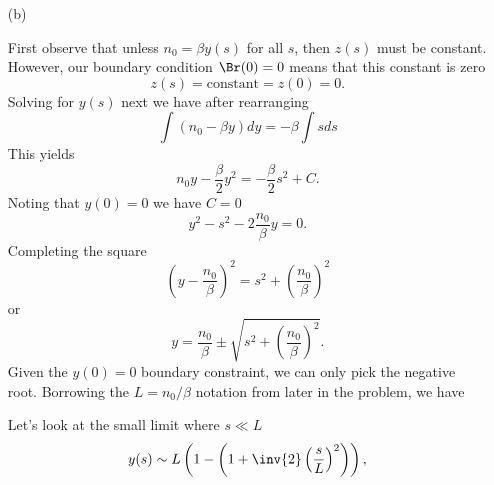 {\begin{enumerate}
We have two non-trivial differential equations to solve.

\item[(b)]

First observe that unless \(n_0 = \beta y(s)\) for all \(s\), then \(z(s)\) must be constant.  However, our boundary condition \(\Br(0) = 0\) means that this constant is zero
%
\begin{equation}\label{eqn:modernOpticsProblemSet1P2:110}
z(s) = \text{constant} = z(0) = 0.
\end{equation}
%
Solving for \(y(s)\) next we have after rearranging
%
\begin{dmath}\label{eqn:modernOpticsProblemSet1P2:130}
\int \left( n_0 - \beta y \right) dy = -\beta \int s ds
\end{dmath}
%
This yields
%
\begin{dmath}\label{eqn:modernOpticsProblemSet1P2:150}
n_0 y - \frac{\beta}{2} y^2 = -\frac{\beta}{2} s^2 + C.
\end{dmath}
%
Noting that \(y(0) = 0\) we have \(C = 0\)
%
\begin{dmath}\label{eqn:modernOpticsProblemSet1P2:170}
y^2 - s^2 - 2 \frac{n_0}{\beta} y = 0.
\end{dmath}
%
Completing the square
%
\begin{dmath}\label{eqn:modernOpticsProblemSet1P2:230}
\left( y - \frac{n_0}{\beta} \right)^2 = s^2 + \left( \frac{n_0}{\beta} \right)^2
\end{dmath}
%
or
%
\begin{dmath}\label{eqn:modernOpticsProblemSet1P2:190}
y = \frac{n_0}{\beta} \pm \sqrt{ s^2 + \left( \frac{n_0}{\beta} \right)^2 }.
\end{dmath}
%
Given the \(y(0) = 0\) boundary constraint, we can only pick the negative root.  Borrowing the \(L = n_0/\beta\) notation from later in the problem, we have


Let's look at the small limit where \(s \ll L\)
%
\begin{dmath}\label{eqn:modernOpticsProblemSet1P2:250}
y(s)
\sim L \left( 1 - \left( 1 + \inv{2} \left(\frac{s}{L}\right)^2 \right) \right),
\end{dmath}
%


\end{enumerate}}
